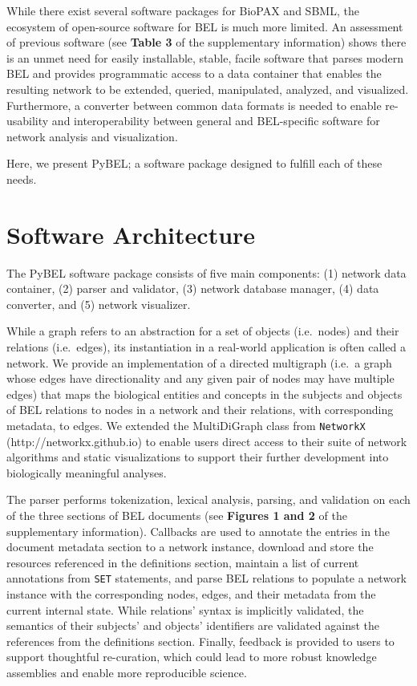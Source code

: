 \documentclass{bioinfo}
\begin{document}
While there exist several software packages for BioPAX and SBML, the ecosystem of open-source software for BEL is much more limited. An assessment of previous software (see \textbf{Table 3} of the supplementary information) shows there is an unmet need for easily installable, stable, facile software that parses modern BEL and provides programmatic access to a data container that enables the resulting network to be extended, queried, manipulated, analyzed, and visualized. Furthermore, a converter between common data formats is needed to enable re-usability and interoperability between general and BEL-specific software for network analysis and visualization. 

Here, we present PyBEL; a software package designed to fulfill each of these needs. 

\section{Software Architecture}

The PyBEL software package consists of five main components: (1) network data container, (2) parser and validator, (3) network database manager, (4) data converter, and (5) network visualizer. 

While a graph refers to an abstraction for a set of objects (i.e.\ nodes) and their relations (i.e.\ edges), its instantiation in a real-world application is often called a network. We provide an implementation of a directed multigraph (i.e.\ a graph whose edges have directionality and any given pair of nodes may have multiple edges) that maps the biological entities and concepts in the subjects and objects of BEL relations to nodes in a network and their relations, with corresponding metadata, to edges. We extended the MultiDiGraph class from \verb|NetworkX| (http://networkx.github.io) to enable users direct access to their suite of network algorithms and static visualizations to support their further development into biologically meaningful analyses.

The parser performs tokenization, lexical analysis, parsing, and validation on each of the three sections of BEL documents (see \textbf{Figures 1 and 2} of the supplementary information). Callbacks are used to annotate the entries in the document metadata section to a network instance, download and store the resources referenced in the definitions section, maintain a list of current annotations from \verb|SET| statements, and parse BEL relations to populate a network instance with the corresponding nodes, edges, and their metadata from the current internal state. While relations' syntax is implicitly validated, the semantics of their subjects' and objects' identifiers are validated against the references from the definitions section. Finally, feedback is provided to users to support thoughtful re-curation, which could lead to more robust knowledge assemblies and enable more reproducible science.
\end{document}
